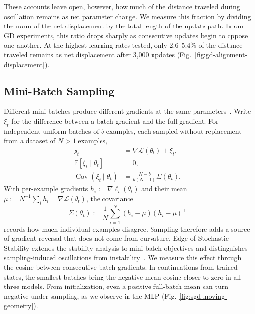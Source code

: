These accounts leave open, however, how much of the distance traveled during oscillation remains as net parameter change. We measure this fraction by dividing the norm of the net displacement by the total length of the update path. In our GD experiments, this ratio drops sharply as consecutive updates begin to oppose one another. At the highest learning rates tested, only 2.6--5.4\% of the distance traveled remains as net displacement after 3,000 updates (Fig.~\ref{fig:gd-alignment-displacement}).

\subsection{Mini-Batch Sampling}

Different mini-batches produce different gradients at the same parameters~\cite{mandt2017sgd,hu2019diffusion,jastrzebski2018three}. Write $\xi_t$ for the difference between a batch gradient and the full gradient. For independent uniform batches of $b$ examples, each sampled without replacement from a dataset of $N>1$ examples,
\begin{equation}
\begin{aligned}
g_t&=\nabla\mathcal L(\theta_t)+\xi_t,\\
\mathbb E[\xi_t\mid\theta_t]&=0,\\
\operatorname{Cov}(\xi_t\mid\theta_t)
  &=\frac{N-b}{b(N-1)}\Sigma(\theta_t).
\end{aligned}
\label{eq:sgd_noise_decomposition}
\end{equation}
With per-example gradients $h_i:=\nabla\ell_i(\theta_t)$ and their mean $\mu:=N^{-1}\sum_i h_i=\nabla\mathcal L(\theta_t)$, the covariance
\begin{equation}
  \Sigma(\theta_t)
  :=\frac{1}{N}\sum_{i=1}^{N}(h_i-\mu)(h_i-\mu)^\top
  \label{eq:grad_cov_def}
\end{equation}
records how much individual examples disagree. Sampling therefore adds a source of gradient reversal that does not come from curvature. Edge of Stochastic Stability extends the stability analysis to mini-batch objectives and distinguishes sampling-induced oscillations from instability~\cite{andreyev2025stochastic}. We measure this effect through the cosine between consecutive batch gradients. In continuations from trained states, the smallest batches bring the negative mean cosine closer to zero in all three models. From initialization, even a positive full-batch mean can turn negative under sampling, as we observe in the MLP (Fig.~\ref{fig:sgd-moving-geometry}).

